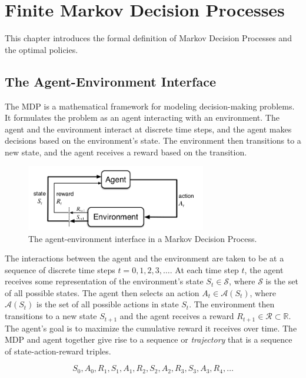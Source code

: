 \section{Finite Markov Decision Processes}

This chapter introduces the formal definition of Markov Decision Processes and the optimal policies.

\subsection{The Agent-Environment Interface}

The MDP is a mathematical framework for modeling decision-making problems. It formulates the problem as an agent interacting with an environment. The agent and the environment interact at discrete time steps, and the agent makes decisions based on the environment's state. The environment then transitions to a new state, and the agent receives a reward based on the transition.

\begin{figure}[h!]
    \centering
    \includegraphics[width=0.7\textwidth]{images/agent-environment.png}
    \caption{The agent-environment interface in a Markov Decision Process.}
    \label{fig:agent-environment}
\end{figure}

The interactions between the agent and the environment are taken to be at a sequence of discrete time steps $t=0,1,2,3,\dots$. At each time step $t$, the agent receives some representation of the environment's state $S_t \in \mathcal{S}$, where $\mathcal{S}$ is the set of all possible states. The agent then selects an action $A_t \in \mathcal{A}(S_t)$, where $\mathcal{A}(S_t)$ is the set of all possible actions in state $S_t$. The environment then transitions to a new state $S_{t+1}$ and the agent receives a reward $R_{t+1}\in\mathcal{R}\subset\mathbb{R}$. The agent's goal is to maximize the cumulative reward it receives over time. The MDP and agent together give rise to a sequence or \textit{trajectory} that is a sequence of state-action-reward triples.

\begin{equation}
    S_0, A_0, R_1, S_1, A_1, R_2, S_2, A_2, R_3, S_3, A_3, R_4, \dots
\end{equation}

